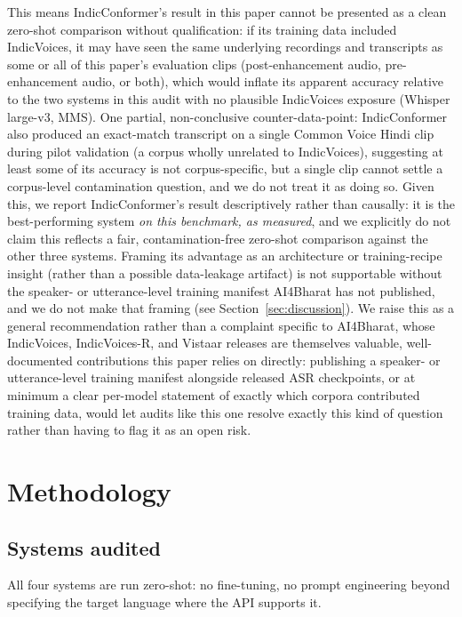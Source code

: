 \documentclass[11pt]{article}
\begin{document}
This means IndicConformer's result in this paper cannot be presented as a clean zero-shot
comparison without qualification: if its training data included IndicVoices, it may have seen the
same underlying recordings and transcripts as some or all of this paper's evaluation clips
(post-enhancement audio, pre-enhancement audio, or both), which would inflate its apparent accuracy
relative to the two systems in this audit with no plausible IndicVoices exposure (Whisper large-v3,
MMS). One partial, non-conclusive counter-data-point: IndicConformer also produced an exact-match
transcript on a single Common Voice Hindi clip during pilot validation (a corpus wholly unrelated
to IndicVoices), suggesting at least some of its accuracy is not corpus-specific, but a single
clip cannot settle a corpus-level contamination question, and we do not treat it as doing so.
Given this, we report IndicConformer's result descriptively rather than causally: it is the
best-performing system \emph{on this benchmark, as measured}, and we explicitly do not claim this
reflects a fair, contamination-free zero-shot comparison against the other three systems. Framing
its advantage as an architecture or training-recipe insight (rather than a possible data-leakage
artifact) is not supportable without the speaker- or utterance-level training manifest AI4Bharat
has not published, and we do not make that framing (see Section~\ref{sec:discussion}). We raise
this as a general recommendation rather than a complaint specific to AI4Bharat, whose IndicVoices,
IndicVoices-R, and Vistaar releases are themselves valuable, well-documented contributions this
paper relies on directly: publishing a speaker- or utterance-level training manifest alongside
released ASR checkpoints, or at minimum a clear per-model statement of exactly which corpora
contributed training data, would let audits like this one resolve exactly this kind of question
rather than having to flag it as an open risk.

\section{Methodology}

\subsection{Systems audited}
\label{sec:systems}

All four systems are run zero-shot: no fine-tuning, no prompt engineering beyond specifying the
target language where the API supports it.
\end{document}
